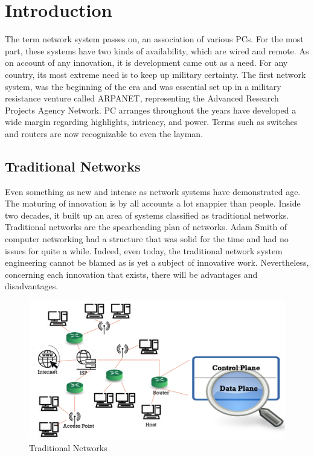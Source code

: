 \chapter{Introduction}

The term network system passes on, an association of various PCs. For the most part, these systems have two kinds of availability, which are wired and remote. As on account of any innovation, it is development came out as a need. For any country, its most extreme need is to keep up military certainty. The first network system, was the beginning of the era and was essential set up in a military resistance venture called ARPANET, representing the Advanced Research Projects Agency Network. PC arranges throughout the years have developed a wide margin regarding highlights, intricacy, and power. Terms such as switches and routers are now recognizable to even the layman.

\vspace{5mm}
\section{Traditional Networks}

Even something as new and intense as network systems have demonstrated age. The maturing of innovation is by all accounts a lot snappier than people. Inside two decades, it built up an area of systems classified as traditional networks. Traditional networks are the spearheading plan of networks. Adam Smith of computer networking had a structure that was solid for the time and had no issues for quite a while. Indeed, even today, the traditional network system engineering cannot be blamed as is yet a subject of innovative work. Nevertheless, concerning each innovation that exists, there will be advantages and disadvantages.

\begin{figure}[!hbt]
    \centering
    \includegraphics[width=\textwidth,keepaspectratio]{images/TRADITIONAL-NETWORK.png}
    \caption{Traditional Networks \cite{sdnimages}}
    \label{fig:Tradnets}
\end{figure}

